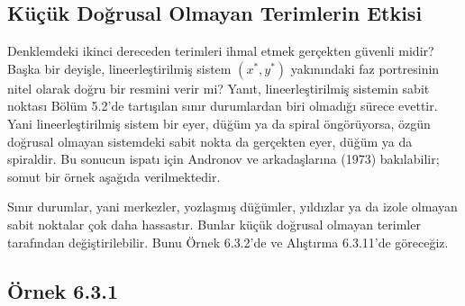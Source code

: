 \subsection*{Küçük Doğrusal Olmayan Terimlerin Etkisi}
{}

\begin{justify}
Denklemdeki ikinci dereceden terimleri ihmal etmek gerçekten güvenli midir? Başka bir deyişle, lineerleştirilmiş sistem $(x^{*},y^{*})$ yakınındaki faz portresinin nitel olarak doğru bir resmini verir mi? Yanıt, lineerleştirilmiş sistemin sabit noktası Bölüm 5.2'de tartışılan sınır durumlardan biri olmadığı sürece evettir. Yani lineerleştirilmiş sistem bir eyer, düğüm ya da spiral öngörüyorsa, özgün doğrusal olmayan sistemdeki sabit nokta da gerçekten eyer, düğüm ya da spiraldir. Bu sonucun ispatı için Andronov ve arkadaşlarına (1973) bakılabilir; somut bir örnek aşağıda verilmektedir.

Sınır durumlar, yani merkezler, yozlaşmış düğümler, yıldızlar ya da izole olmayan sabit noktalar çok daha hassastır. Bunlar küçük doğrusal olmayan terimler tarafından değiştirilebilir. Bunu Örnek 6.3.2'de ve Alıştırma 6.3.11'de göreceğiz.
\end{justify}

\subsection*{Örnek 6.3.1}
{}

